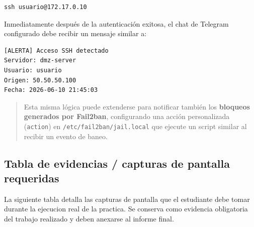 \documentclass{article}
\renewcommand{\_}{\oldunderscore\hskip0pt\relax}
\begin{document}
\begin{Verbatim}[fontsize=\footnotesize,frame=single,rulecolor=\color{codebg},fillcolor=\color{codebg},framesep=2mm,xleftmargin=1mm,xrightmargin=1mm,breaklines=true,breakanywhere=true,breaksymbolleft={},breaksymbolright={}]
ssh usuario@172.17.0.10
\end{Verbatim}

Inmediatamente después de la autenticación exitosa, el chat de Telegram
configurado debe recibir un mensaje similar a:

\begin{Verbatim}[fontsize=\footnotesize,frame=single,rulecolor=\color{codebg},fillcolor=\color{codebg},framesep=2mm,xleftmargin=1mm,xrightmargin=1mm,breaklines=true,breakanywhere=true,breaksymbolleft={},breaksymbolright={}]
[ALERTA] Acceso SSH detectado
Servidor: dmz-server
Usuario: usuario
Origen: 50.50.50.100
Fecha: 2026-06-10 21:45:03
\end{Verbatim}

\begin{quote}
Esta misma lógica puede extenderse para notificar también los
\textbf{bloqueos generados por Fail2ban}, configurando una acción
personalizada (\texttt{action}) en \texttt{/etc/fail2ban/jail.local} que
ejecute un script similar al recibir un evento de baneo.
\end{quote}

\hypertarget{tabla-de-evidencias-capturas-de-pantalla-requeridas}{%
\subsection{Tabla de evidencias / capturas de pantalla requeridas}\label{tabla-de-evidencias-capturas-de-pantalla-requeridas}}

La siguiente tabla detalla las capturas de pantalla que el estudiante debe tomar durante la ejecucion real de la practica. Se conserva como evidencia obligatoria del trabajo realizado y deben anexarse al informe final.
\end{document}
